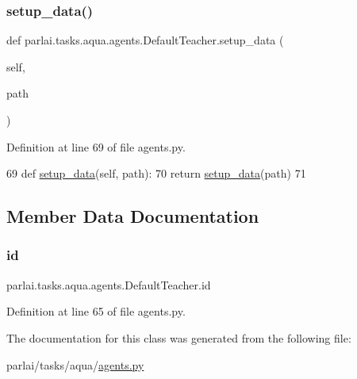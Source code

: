 \subsubsection{\texorpdfstring{setup\+\_\+data()}{setup\_data()}}
{\footnotesize\ttfamily def parlai.\+tasks.\+aqua.\+agents.\+Default\+Teacher.\+setup\+\_\+data (\begin{DoxyParamCaption}\item[{}]{self,  }\item[{}]{path }\end{DoxyParamCaption})}



Definition at line 69 of file agents.\+py.


\begin{DoxyCode}
69     \textcolor{keyword}{def }\hyperlink{namespaceparlai_1_1tasks_1_1multinli_1_1agents_a4fa2cb0ba1ed745336ad8bceed36b841}{setup\_data}(self, path):
70         \textcolor{keywordflow}{return} \hyperlink{namespaceparlai_1_1tasks_1_1multinli_1_1agents_a4fa2cb0ba1ed745336ad8bceed36b841}{setup\_data}(path)
71 \end{DoxyCode}


\subsection{Member Data Documentation}
\mbox{\label{classparlai_1_1tasks_1_1aqua_1_1agents_1_1DefaultTeacher_a7f24ae016e64a6b1b6c091598b204897}} 
\subsubsection{\texorpdfstring{id}{id}}
{\footnotesize\ttfamily parlai.\+tasks.\+aqua.\+agents.\+Default\+Teacher.\+id}



Definition at line 65 of file agents.\+py.



The documentation for this class was generated from the following file\+:\begin{DoxyCompactItemize}
\item 
parlai/tasks/aqua/\hyperlink{parlai_2tasks_2aqua_2agents_8py}{agents.\+py}\end{DoxyCompactItemize}
